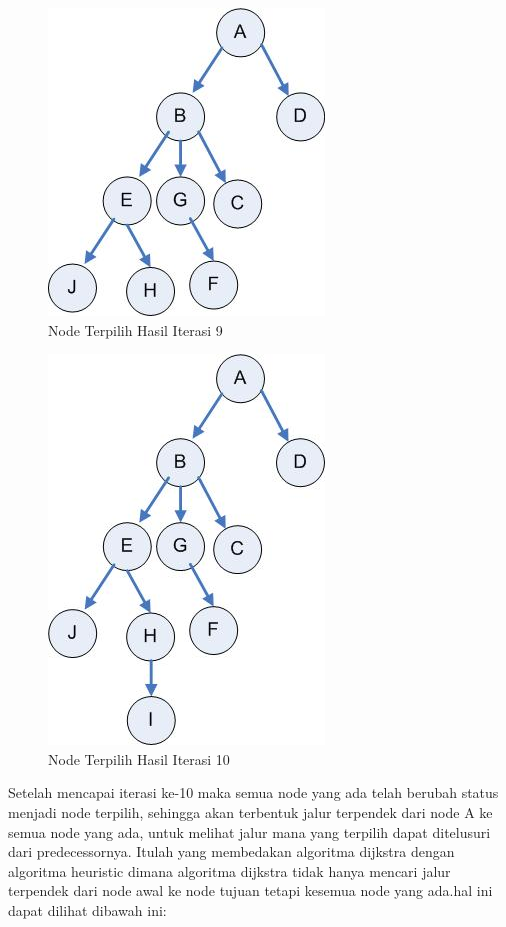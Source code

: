 \begin{enumerate}
\begin{figure}[htbp]
\begin{center}
	\includegraphics[scale=0.5]{fig/sunario-3/ABDEGCJHF.jpg}%
	\caption{Node Terpilih Hasil Iterasi 9}%
\end{center}
\end{figure}

\begin{figure}[htbp]
\begin{center}
	\includegraphics[scale=0.5]{fig/sunario-3/ABDEGCJHFI.jpg}%
	\caption{Node Terpilih Hasil Iterasi 10}%
\end{center}
\end{figure}

\newpage
Setelah mencapai iterasi ke-10 maka semua node yang ada telah berubah status menjadi node terpilih, sehingga akan terbentuk jalur terpendek dari node A ke semua node yang ada, untuk melihat jalur mana yang terpilih dapat ditelusuri dari predecessornya. Itulah yang membedakan algoritma dijkstra dengan algoritma heuristic dimana algoritma dijkstra tidak hanya mencari jalur terpendek dari node awal ke node tujuan tetapi kesemua node yang ada.hal ini dapat dilihat dibawah ini:


\end{enumerate}
